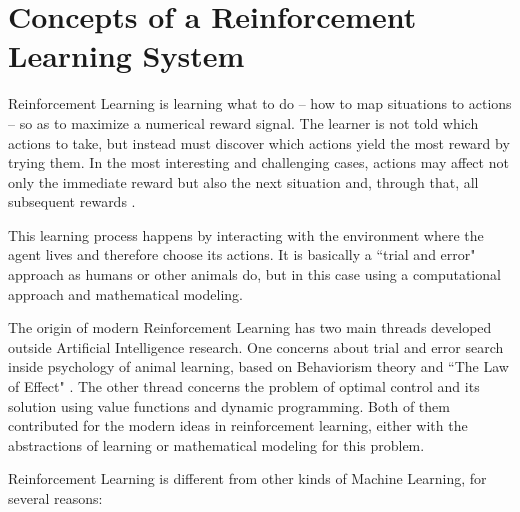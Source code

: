 \section{Concepts of a Reinforcement Learning System} \label{sec:rlconcepts}

Reinforcement Learning is learning what to do -- how to map situations to actions -- so as to maximize
a numerical reward signal. The learner is not told which actions to take, but instead must discover
which actions yield the most reward by trying them. In the most interesting and challenging cases,
actions may affect not only the immediate reward but also the next situation and, through that, all
subsequent rewards \cite{sutton1998rli}.

This learning process happens by interacting with the environment where the agent lives and therefore choose its actions. It is basically a ``trial and error" approach as humans or other animals do, but in this case using a computational approach and mathematical modeling.

The origin of modern Reinforcement Learning has two main threads developed outside Artificial Intelligence research. One concerns about trial and error search inside psychology of animal learning, based on Behaviorism theory \cite{skinner1953science} and ``The Law of Effect" \cite{Thorndike173}. The other thread concerns the problem of optimal control and its solution using value functions
and dynamic programming. Both of them contributed for the modern ideas in reinforcement learning, either with the abstractions of learning or mathematical modeling for this problem.

Reinforcement Learning is different from other kinds of Machine Learning, for several reasons:

